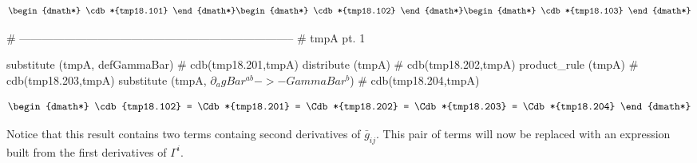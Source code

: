 \documentclass[12pt]{cdblatex}
\begin{document}
\begin{dgroup*}
   \begin{dmath*} \cdb*{tmp18.101} \end{dmath*}
   \begin{dmath*} \cdb*{tmp18.102} \end{dmath*}
   \begin{dmath*} \cdb*{tmp18.103} \end{dmath*}
\end{dgroup*}

\clearpage

\begin{cadabra}
   # --------------------------------------------------------------------------
   # tmpA pt. 1

   substitute   (tmpA, defGammaBar)                                     # cdb(tmp18.201,tmpA)
   distribute   (tmpA)                                                  # cdb(tmp18.202,tmpA)
   product_rule (tmpA)                                                  # cdb(tmp18.203,tmpA)
   substitute   (tmpA, $\partial_{a}{gBar^{a b}} -> - GammaBar^{b}$)    # cdb(tmp18.204,tmpA)
\end{cadabra}

\begin{dgroup*}[spread=5pt]
   \begin{dmath*}
      \cdb{tmp18.102}
         = \Cdb*{tmp18.201}
         = \Cdb*{tmp18.202}
         = \Cdb*{tmp18.203}
         = \Cdb*{tmp18.204}
   \end{dmath*}
\end{dgroup*}

Notice that this result contains two terms containg second derivatives of $\bar g_{ij}$.
This pair of terms will now be replaced with an expression built from the first derivatives
of $\Gamma^{i}$.

\clearpage
\end{document}
